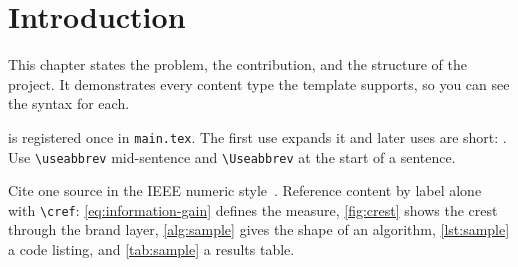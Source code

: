 \chapter{Introduction}
This chapter states the problem, the contribution, and the structure of the project. It demonstrates every content type the template supports, so you can see the syntax for each.

 is registered once in \texttt{main.tex}. The first use expands it and later uses are short: . Use \texttt{\textbackslash useabbrev} mid-sentence and \texttt{\textbackslash Useabbrev} at the start of a sentence.

Cite one source in the IEEE numeric style~\autocite{knuth1984}. Reference content by label alone with \texttt{\textbackslash cref}: \cref{eq:information-gain} defines the measure, \cref{fig:crest} shows the crest through the brand layer, \cref{alg:sample} gives the shape of an algorithm, \cref{lst:sample} a code listing, and \cref{tab:sample} a results table.
